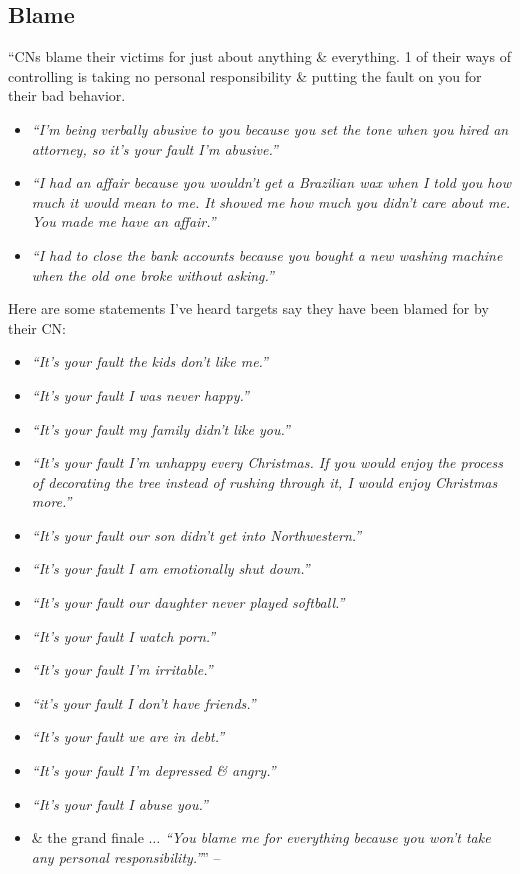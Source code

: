 \documentclass{article}
\numberwithin{equation}{section}
\begin{document}
\subsection{Blame}
``CNs blame their victims for just about anything \& everything. 1 of their ways of controlling is taking no personal responsibility \& putting the fault on you for their bad behavior.
\begin{itemize}
	\item \textit{``I'm being verbally abusive to you because you set the tone when you hired an attorney, so it's your fault I'm abusive.''}
	\item \textit{``I had an affair because you wouldn't get a Brazilian wax when I told you how much it would mean to me. It showed me how much you didn't care about me. You made me have an affair.''}
	\item \textit{``I had to close the bank accounts because you bought a new washing machine when the old one broke without asking.''}
\end{itemize}
Here are some statements I've heard targets say they have been blamed for by their CN:
\begin{itemize}
	\item \textit{``It's your fault the kids don't like me.''}
	\item \textit{``It's your fault I was never happy.''}
	\item \textit{``It's your fault my family didn't like you.''}
	\item \textit{``It's your fault I'm unhappy every Christmas. If you would enjoy the process of decorating the tree instead of rushing through it, I would enjoy Christmas more.''}
	\item \textit{``It's your fault our son didn't get into Northwestern.''}
	\item \textit{``It's your fault I am emotionally shut down.''}
	\item \textit{``It's your fault our daughter never played softball.''}
	\item \textit{``It's your fault I watch porn.''}
	\item \textit{``It's your fault I'm irritable.''}
	\item \textit{``it's your fault I don't have friends.''}
	\item \textit{``It's your fault we are in debt.''}
	\item \textit{``It's your fault I'm depressed \& angry.''}
	\item \textit{``It's your fault I abuse you.''}
	\item \& the grand finale $\ldots$ \textit{``You blame me for everything because you won't take any personal responsibility.''}'' -- \cite[p. 82]{Mirza2017}
\end{itemize}
\end{document}
